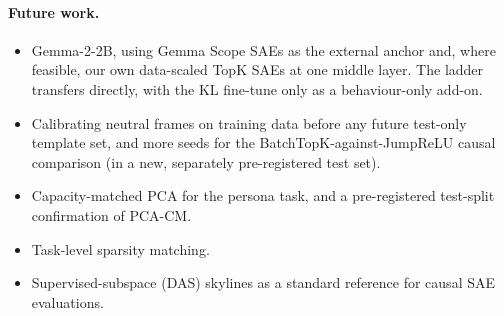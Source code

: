 \paragraph{Future work.}
\begin{itemize}
\item Gemma-2-2B, using Gemma Scope SAEs as the external anchor and, where feasible, our own data-scaled TopK SAEs at
  one middle layer. The ladder transfers directly, with the KL fine-tune only as a behaviour-only add-on.
\item Calibrating neutral frames on training data before any future test-only template set, and more seeds for the
  BatchTopK-against-JumpReLU causal comparison (in a new, separately pre-registered test set).
\item Capacity-matched PCA for the persona task, and a pre-registered test-split confirmation of PCA-CM.
\item Task-level sparsity matching.
\item Supervised-subspace (DAS) skylines as a standard reference for causal SAE evaluations.
\end{itemize}
